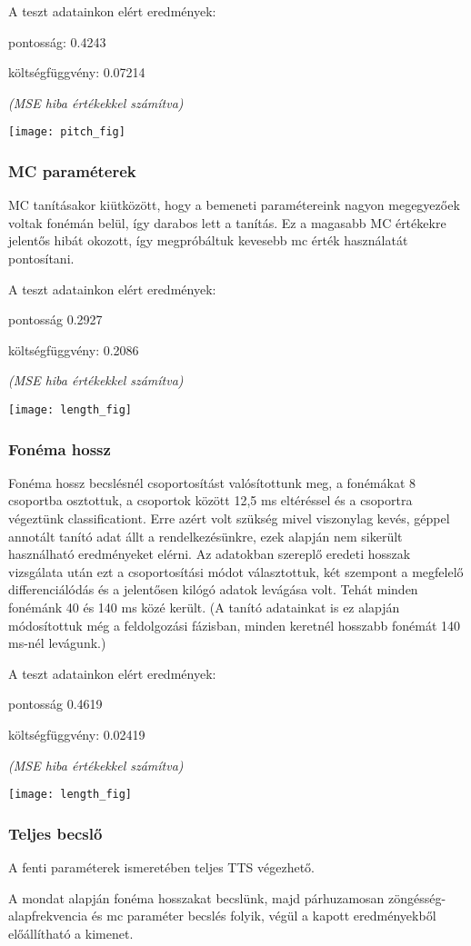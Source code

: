 A teszt adatainkon elért eredmények:

pontosság: 0.4243

költségfüggvény: 0.07214

\textit{(MSE hiba értékekkel számítva)}

\texttt{[image: pitch\_fig]}
\subsubsection{MC paraméterek}
MC tanításakor kiütközött, hogy a bemeneti paramétereink nagyon megegyezőek voltak fonémán belül, így darabos lett a tanítás. Ez a magasabb MC értékekre jelentős hibát okozott, így megpróbáltuk kevesebb mc érték használatát pontosítani.

\begin{minipage}{0.5\textwidth}	
	A teszt adatainkon elért eredmények:
	
	pontosság 0.2927
	
	költségfüggvény: 0.2086
	
	\textit{(MSE hiba értékekkel számítva)}
\end{minipage}
\begin{minipage}{0.5\textwidth}
	\flushright	
	\texttt{[image: length\_fig]}
\end{minipage}
\subsubsection{Fonéma hossz}
Fonéma hossz becslésnél csoportosítást valósítottunk meg, a fonémákat 8 csoportba osztottuk, a csoportok között 12,5 ms eltéréssel és a csoportra végeztünk classificationt. Erre azért volt szükség mivel viszonylag kevés, géppel annotált tanító adat állt a rendelkezésünkre, ezek alapján nem sikerült használható eredményeket elérni. Az adatokban szereplő eredeti hosszak vizsgálata után ezt a csoportosítási módot választottuk, két szempont a megfelelő differenciálódás és a jelentősen kilógó adatok levágása volt. Tehát minden fonémánk 40 és 140 ms közé került. (A tanító adatainkat is ez alapján módosítottuk még a feldolgozási fázisban, minden keretnél hosszabb fonémát 140 ms-nél levágunk.)

\begin{minipage}{0.5\textwidth}	
	A teszt adatainkon elért eredmények:
	
	pontosság 0.4619
	
	költségfüggvény: 0.02419
	
	\textit{(MSE hiba értékekkel számítva)}
\end{minipage}
\begin{minipage}{0.5\textwidth}
	\flushright	
	\texttt{[image: length\_fig]}
\end{minipage}

\subsubsection{Teljes becslő}
A fenti paraméterek ismeretében teljes TTS végezhető. 

A mondat alapján fonéma hosszakat becslünk, majd párhuzamosan zöngésség-alapfrekvencia és mc paraméter becslés folyik, végül a kapott eredményekből előállítható a kimenet.